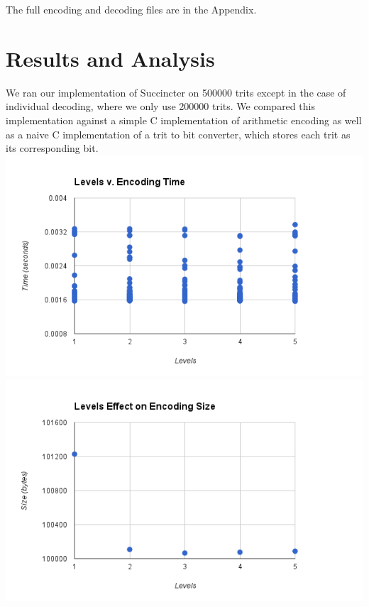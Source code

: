 \documentclass{article}
\begin{document}
The full encoding and decoding files are in the Appendix.\\


\bigskip

\noindent \section{Results and Analysis}

We ran our implementation of Succincter on 500000 trits except in the case of individual decoding, where we only use 200000 trits. We compared this implementation against a simple C implementation of arithmetic encoding as well as a naive C implementation of a trit to bit converter, which stores each trit as its corresponding bit.\\

\includegraphics[scale=0.4]{images/betterlevel_v_encode}
\includegraphics[scale=0.4]{images/lvl_encodingsize}
\afterpage{\vfill}
\end{document}
